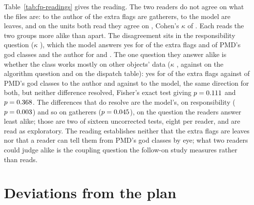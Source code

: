 \documentclass[11pt,a4paper]{article}
\begin{document}
Table~\ref{tab:fp-readings} gives the reading. The two readers do not agree on
what the files are: to the author \fpReadAuthorFpGathererPct{} of the extra
flags are gatherers, to the model \fpReadModelFpLeafPct{} are leaves, and on
the \fpKappaAuthorModelN{} units both read they agree on
\fpKappaAuthorModelAgree{}, Cohen's $\kappa$ of \fpKappaAuthorModel{}. Each
reads the two groups more alike than apart. The disagreement sits in the
responsibility question ($\kappa$ \fpKappaAuthorModelQTwo{}), which the model
answers yes for \fpReadModelFpQTwoYesPct{} of the extra flags and
\fpReadModelTpQTwoYesPct{} of PMD's god classes and the author for
\fpReadAuthorFpQTwoYesPct{} and \fpReadAuthorTpQTwoYesPct{}. The one question
they answer alike is whether the class works mostly on other objects' data
($\kappa$ \fpKappaAuthorModelQThree{}, against \fpKappaAuthorModelQOne{} on
the algorithm question and \fpKappaAuthorModelQFour{} on the dispatch
table): yes for
\fpReadAuthorFpQThreeYesPct{} of the extra flags against
\fpReadAuthorTpQThreeYesPct{} of PMD's god classes to the author and
\fpReadModelFpQThreeYesPct{} against \fpReadModelTpQThreeYesPct{} to the
model, the same direction for both, but neither difference resolved,
Fisher's exact test giving $p = 0.111{}$ and $p =
0.368{}$. The differences that do resolve are the model's, on
responsibility ($p = 0.003{}$) and so on gatherers ($p =
0.045{}$), on the question the readers answer least alike;
those are two of sixteen uncorrected tests, eight per reader, and are read as
exploratory. The reading establishes neither that the
extra flags are leaves nor that a reader can tell them from PMD's god classes
by eye; what two readers could judge alike is the coupling question the
follow-on study measures rather than reads.

\section{Deviations from the plan}
\label{sec:deviations}
\end{document}
